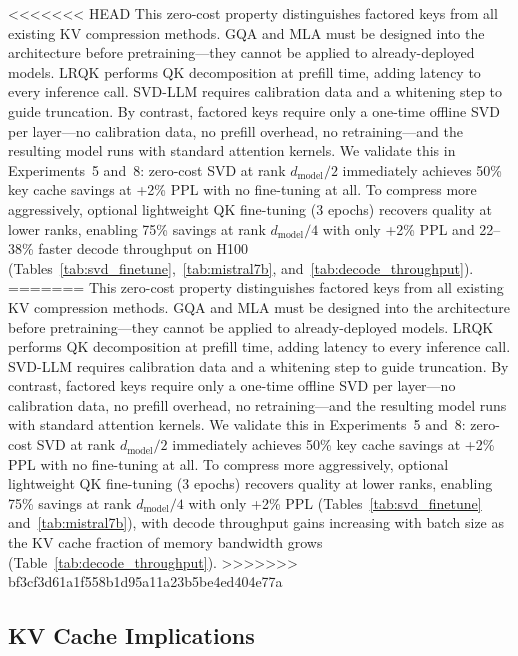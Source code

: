 \documentclass{article} %
\newcommand{\dmodel}{d_{\text{model}}}
\begin{document}
<<<<<<< HEAD
This zero-cost property distinguishes factored keys from all existing KV compression methods. GQA \citep{ainslie2023gqa} and MLA \citep{liu2024deepseek} must be designed into the architecture before pretraining---they cannot be applied to already-deployed models. LRQK \citep{lrqk2025} performs QK decomposition at prefill time, adding latency to every inference call. SVD-LLM \citep{svdllm2025} requires calibration data and a whitening step to guide truncation. By contrast, factored keys require only a one-time offline SVD per layer---no calibration data, no prefill overhead, no retraining---and the resulting model runs with standard attention kernels. We validate this in Experiments~5 and~8: zero-cost SVD at rank $\dmodel/2$ immediately achieves 50\% key cache savings at +2\% PPL with no fine-tuning at all. To compress more aggressively, optional lightweight QK fine-tuning (3 epochs) recovers quality at lower ranks, enabling 75\% savings at rank $\dmodel/4$ with only +2\% PPL and 22--38\% faster decode throughput on H100 (Tables~\ref{tab:svd_finetune},~\ref{tab:mistral7b}, and~\ref{tab:decode_throughput}).
=======
This zero-cost property distinguishes factored keys from all existing KV compression methods. GQA \citep{ainslie2023gqa} and MLA \citep{liu2024deepseek} must be designed into the architecture before pretraining---they cannot be applied to already-deployed models. LRQK \citep{lrqk2025} performs QK decomposition at prefill time, adding latency to every inference call. SVD-LLM \citep{svdllm2025} requires calibration data and a whitening step to guide truncation. By contrast, factored keys require only a one-time offline SVD per layer---no calibration data, no prefill overhead, no retraining---and the resulting model runs with standard attention kernels. We validate this in Experiments~5 and~8: zero-cost SVD at rank $\dmodel/2$ immediately achieves 50\% key cache savings at +2\% PPL with no fine-tuning at all. To compress more aggressively, optional lightweight QK fine-tuning (3 epochs) recovers quality at lower ranks, enabling 75\% savings at rank $\dmodel/4$ with only +2\% PPL (Tables~\ref{tab:svd_finetune} and~\ref{tab:mistral7b}), with decode throughput gains increasing with batch size as the KV cache fraction of memory bandwidth grows (Table~\ref{tab:decode_throughput}).
>>>>>>> bf3cf3d61a1f558b1d95a11a23b5be4ed404e77a


\subsection{KV Cache Implications}
\end{document}
